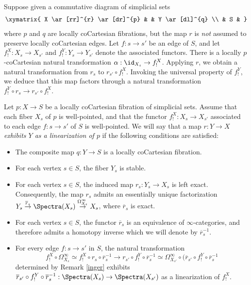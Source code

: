 \begin{remark}\label{inger}
Suppose given a commutative diagram of simplicial sets
$$ \xymatrix{ X \ar[rr]^{r} \ar[dr]^{p} & & Y \ar[dl]^{q} \\
& S & }$$
where $p$ and $q$ are locally coCartesian fibrations, but the map
$r$ is {\em not} assumed to preserve locally coCartesian edges. Let
$f: s \rightarrow s'$ be an edge of $S$, and let $f^{X}_!: X_{s} \rightarrow X_{s'}$ and
$f^{Y}_{!}: Y_{s} \rightarrow Y_{s'}$ denote the associated functors. There is a locally $p$-coCartesian natural transformation $\alpha: \id_{X_s} \rightarrow f^{X}_{!}$. Applying
$r$, we obtain a natural transformation from $r_{s}$ to $r_{s'} \circ f^{X}_{!}$.
Invoking the universal property of $f^{Y}_{!}$, we deduce that this map factors
through a natural transformation $f^{Y}_{!} \circ r_{s} \rightarrow r_{s'} \circ f^{X}_{!}$.
\end{remark}

\begin{definition}\label{hagg}
Let $p: X \rightarrow S$ be a locally coCartesian fibration of simplicial sets.
Assume that each fiber $X_{s}$ of $p$ is well-pointed, and that the functor
$f^{X}_{!}: X_{s} \rightarrow X_{s'}$ associated to each edge $f: s \rightarrow s'$
of $S$ is well-pointed. We will say that a map $r: Y \rightarrow X$
{\it exhibits $Y$ as a linearization of $p$} if the following conditions are satisfied:
\begin{itemize}
\item[$(1)$] The composite map $q: Y \rightarrow S$ is a locally coCartesian fibration.
\item[$(2)$] For each vertex $s \in S$, the fiber $Y_{s}$ is stable.
\item[$(3)$] For each vertex $s \in S$, the induced map $r_{s}: Y_{s} \rightarrow X_{s}$
is left exact. Consequently, the map $r_{s}$ admits an essentially unique factorization
$Y_{s} \stackrel{ \overline{r}_{s}}{\rightarrow} \Spectra(X_{s}) \stackrel{ \Omega^{\infty}_{X_s}}{\rightarrow} X_{s}$, where $\overline{r}_s$ is exact.
\item[$(4)$] For each vertex $s \in S$, the functor $\overline{r}_s$ is an equivalence
of $\infty$-categories, and therefore admits a homotopy inverse which we will denote
by $\overline{r}_{s}^{-1}$.
\item[$(5)$] For every edge $f: s \rightarrow s'$ in $S$, the natural transformation
$$f^{X}_{!} \circ \Omega^{\infty}_{X_s} \simeq f^{X}_{!} \circ r_{s} 
\circ \overline{r}_{s}^{-1} \rightarrow r_{s'} \circ f^{Y}_{!} \circ \overline{r}_{s}^{-1}
\simeq \Omega^{\infty}_{ X_{s'} } \circ ( \overline{r}_{s'} \circ f^{Y}_{!} \circ \overline{r}_{s}^{-1}$$ 
determined by Remark \ref{inger} exhibits $\overline{r}_{s'} \circ f^{Y}_{!} \circ \overline{r}_{s}^{-1}: \Spectra(X_s) \rightarrow \Spectra( X_{s'} )$ as a linearization of $f^{X}_{!}$.
\end{itemize}
\end{definition}

